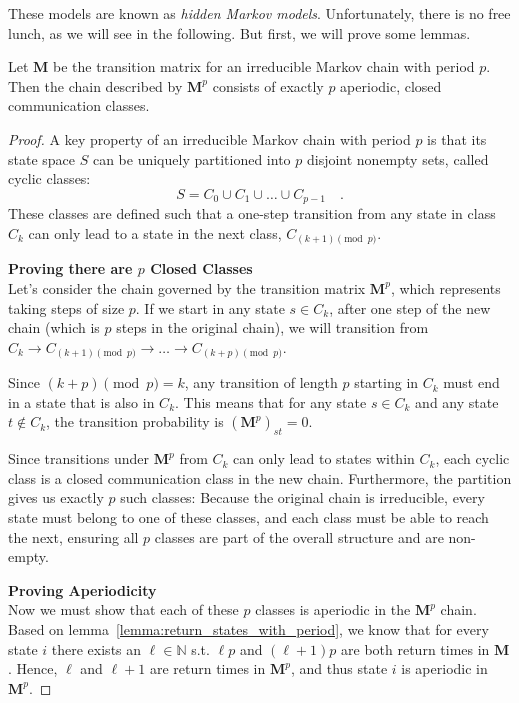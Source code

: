 \documentclass[../../main.tex]{subfiles}
\begin{document}
    \bigskip
    These models are known as \emph{hidden Markov models}. Unfortunately, there is no free lunch, as we will see in the following. But first, we will prove some lemmas.

    \begin{lemma}
        \label{lemma:raising_marov_matrix_to_its_period}
        Let $\bm{M}$ be the transition matrix for an irreducible Markov chain with period $p$. Then the chain described by $\bm{M}^p$ consists of exactly $p$ aperiodic, closed communication classes.
    \end{lemma}
    \vspace{-2.5em}
    \begin{proof}
        A key property of an irreducible Markov chain with period $p$ is that its state space $S$ can be uniquely partitioned into $p$ disjoint nonempty sets, called cyclic classes:
        \[
            S = C_0 \cup C_1 \cup \dots \cup C_{p-1} \quad .
        \]
        These classes are defined such that a one-step transition from any state in class $C_k$ can only lead to a state in the next class, $C_{(k+1) \pmod p}$.

        \textbf{Proving there are $p$ Closed Classes} \\
        Let's consider the chain governed by the transition matrix $\bm{M}^p$, which represents taking steps of size $p$. If we start in any state $s \in C_k$, after one step of the new chain (which is $p$ steps in the original chain), we will transition from $C_k \to C_{(k+1) \pmod p} \to \dots \to C_{(k+p) \pmod p}$.
        
        Since $(k+p) \pmod p = k$, any transition of length $p$ starting in $C_k$ must end in a state that is also in $C_k$. This means that for any state $s \in C_k$ and any state $t \notin C_k$, the transition probability is $(\bm{M}^p)_{st} = 0$.
        
        Since transitions under $\bm{M}^p$ from $C_k$ can only lead to states within $C_k$, each cyclic class is a closed communication class in the new chain. Furthermore, the partition gives us exactly $p$ such classes: Because the original chain is irreducible, every state must belong to one of these classes, and each class must be able to reach the next, ensuring all $p$ classes are part of the overall structure and are non-empty.

        \textbf{Proving Aperiodicity} \\
        Now we must show that each of these $p$ classes is aperiodic in the $\bm{M}^p$ chain. Based on lemma~\ref{lemma:return_states_with_period}, we know that for every state $i$ there exists an $\ell \in \mathbb{N}$ s.t. $\ell p$ and $(\ell + 1) p$ are both return times in $\bm{M}$. Hence, $\ell$ and $\ell + 1$ are return times in $\bm{M}^p$, and thus state $i$ is aperiodic in $\bm{M}^p$.
    \end{proof}
\end{document}
